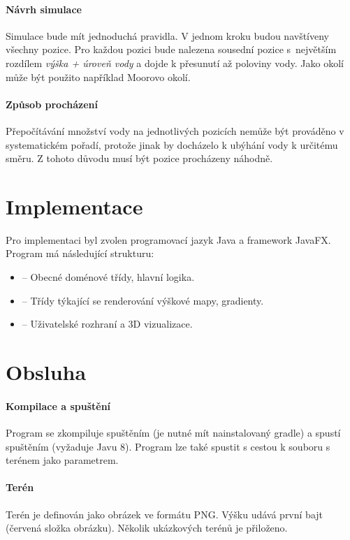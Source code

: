 \documentclass[12pt, a4paper]{article}
\begin{document}
\paragraph{Návrh simulace}
Simulace bude mít jednoduchá pravidla.
V jednom kroku budou navštíveny všechny pozice.
Pro každou pozici bude nalezena sousední pozice s~největším rozdílem \emph{výška + úroveň vody} a dojde k přesunutí až poloviny vody.
Jako okolí může být použito například Moorovo okolí.

\paragraph{Způsob procházení}
Přepočítávání množství vody na jednotlivých pozicích ne\-může být prováděno v systematickém pořadí, protože jinak by docházelo k ubýhání vody k určitému směru.
Z tohoto důvodu musí být pozice procházeny náhodně.


\section*{Implementace}
Pro implementaci byl zvolen programovací jazyk Java a framework JavaFX.
Program má následující strukturu:
\begin{itemize}
	\item {} -- Obecné doménové třídy, hlavní logika.
	\item {} -- Třídy týkající se renderování výškové mapy, gradienty.
	\item {} -- Uživatelské rozhraní a 3D vizualizace.
\end{itemize}

\section*{Obsluha}

\paragraph{Kompilace a spuštění}
Program se zkompiluje spuštěním  (je nutné mít nainstalovaný gradle) a spustí spuštěním  (vyžaduje Javu 8).
Program lze také spustit s cestou k souboru s terénem jako parametrem.

\paragraph{Terén}
Terén je definován jako obrázek ve formátu PNG.
Výšku udává první bajt (červená složka obrázku).
Několik ukázkových terénů je přiloženo.
\end{document}
